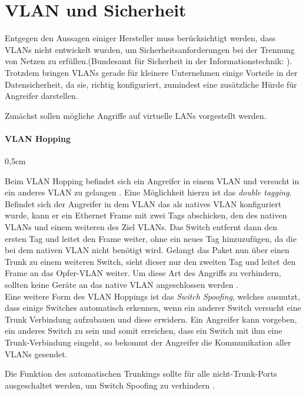 \section{VLAN und Sicherheit}

\glqq Entgegen den Aussagen einiger Hersteller muss berücksichtigt werden, dass VLANs nicht entwickelt wurden, um Sicherheitsanforderungen bei der Trennung von Netzen zu erfüllen.\grqq (Bundesamt für Sicherheit in der Informationstechnik: \cite{bsiswitch}).\\

Trotzdem bringen VLANs gerade für kleinere Unternehmen einige Vorteile in der Datensicherheit, da sie, richtig konfiguriert, zumindest eine zusätzliche Hürde für Angreifer darstellen. 

Zunächst sollen mögliche Angriffe auf virtuelle LANs vorgestellt werden.

 \paragraph{VLAN Hopping}
  \begin{addmargin}[1cm]{0,5cm} 

  {Beim VLAN Hopping befindet sich ein Angreifer in einem VLAN und versucht in ein anderes VLAN zu gelangen \cite{alabady2008design}. 
  Eine Möglichkeit hierzu ist das \emph{double tagging}. Befindet sich der Angreifer in dem VLAN das als natives VLAN konfiguriert wurde, kann er ein Ethernet Frame mit zwei Tags abschicken, den des nativen VLANs und einem weiteren des Ziel VLANs. Das Switch entfernt dann den ersten Tag und leitet den Frame weiter, ohne ein neues Tag hinzuzufügen, da die bei dem nativen VLAN nicht benötigt wird. Gelangt das Paket nun über einen Trunk zu einem weiteren Switch, sieht dieser nur den zweiten Tag und leitet den Frame an das Opfer-VLAN weiter.
  Um diese Art des Angriffs zu verhindern, sollten keine Geräte an das native VLAN angeschlossen werden \cite{cisco14rout}.\\
  
 
  
 Eine weitere Form des VLAN Hoppings ist das \emph{Switch Spoofing}, welches ausnutzt, dass einige Switches automatisch erkennen, wenn ein anderer Switch versucht eine Trunk Verbindung aufzubauen und diese erwidern. Ein Angreifer kann vorgeben, ein anderes Switch zu sein und somit erreichen, dass ein Switch mit ihm eine Trunk-Verbindung eingeht, so bekommt der Angreifer die Kommunikation aller VLANs gesendet. 
 
 Die Funktion des automatischen Trunkings sollte für alle nicht-Trunk-Ports ausgeschaltet werden, um Switch Spoofing zu verhindern \cite{cisco14rout}. }
 
  \end{addmargin}
   
